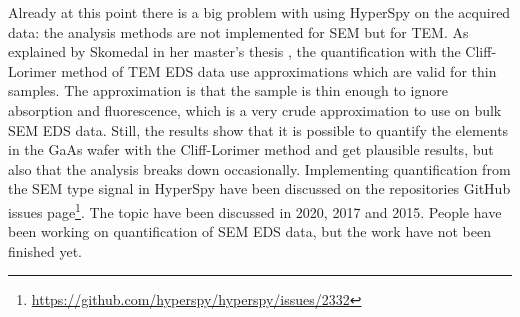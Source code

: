 Already at this point there is a big problem with using HyperSpy on the acquired data: the analysis methods are not implemented for SEM but for TEM.
As explained by Skomedal in her master's thesis \cite{skomedal_improving_2022}, the quantification with the Cliff-Lorimer method of TEM EDS data use approximations which are valid for thin samples.
The approximation is that the sample is thin enough to ignore absorption and fluorescence, which is a very crude approximation to use on bulk SEM EDS data.
Still, the results show that it is possible to quantify the elements in the GaAs wafer with the Cliff-Lorimer method and get plausible results, but also that the analysis breaks down occasionally. %
Implementing quantification from the SEM type signal in HyperSpy have been discussed on the repositories GitHub issues page\footnote{\url{https://github.com/hyperspy/hyperspy/issues/2332}}.
The topic have been discussed in 2020, 2017 and 2015.
People have been working on quantification of SEM EDS data, but the work have not been finished yet.

